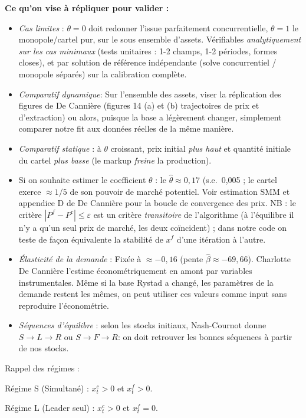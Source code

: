 \documentclass[11pt]{article}
\begin{document}
\textbf{Ce qu'on vise à répliquer pour valider :}
\begin{itemize}\itemsep1pt
\item \emph{Cas limites} : $\theta=0$ doit redonner l'issue parfaitement concurrentielle, $\theta=1$
le monopole/cartel pur, sur le sous ensemble d'assets. Vérifiables \emph{analytiquement sur les cas minimaux} (tests unitaires : 1-2 champs, 1-2 périodes, formes closes), et par solution de référence indépendante (solve concurrentiel / monopole séparés) sur la calibration complète.
\item \emph{Comparatif dynamique}: Sur l'ensemble des assets, viser la réplication des figures de De Cannière (figures 14 (a) et (b) trajectoires de prix et d'extraction) ou alors, puisque la base a légèrement changer, simplement comparer notre fit aux données réelles de la même manière. 
\item \emph{Comparatif statique} : à $\theta$ croissant, prix initial \emph{plus haut} et quantité
initiale du cartel \emph{plus basse} (le markup \emph{freine} la production).
\item Si on souhaite estimer le coefficient $\theta$ : le $\hat\theta\approx 0{,}17$ (s.e.\ 0{,}005 ;  le cartel exerce $\approx 1/5$ de son pouvoir de marché potentiel. Voir estimation SMM et appendice D de De Cannière pour la boucle de convergence des prix. NB : le critère $|P^f-P^c|\le\varepsilon$ est un critère \emph{transitoire} de l'algorithme (à l'équilibre il n'y a qu'un seul prix de marché, les deux co\"incident) ; dans notre code on teste de façon équivalente la stabilité de $x^f$ d'une itération à l'autre.
\item \emph{Élasticité de la demande} : Fixée à $\approx -0{,}16$ (pente $\hat\beta\approx-69{,}66$). Charlotte De Cannière l'estime économétriquement en amont par variables instrumentales. Même si la base Rystad a changé, les paramètres de la demande restent les mêmes, on peut utiliser ces valeurs comme input sans reproduire l'économétrie. 
\item \emph{Séquences d'équilibre} : selon les stocks initiaux, Nash-Cournot donne $S\!\to\!L\!\to\!R$
ou $S\!\to\!F\!\to\!R$: on doit retrouver les bonnes séquences à partir de nos stocks.
\end{itemize}

Rappel des régimes : 

Régime S (Simultané) : $x^c_t > 0$ et $x^f_t > 0$.  

Régime L (Leader seul) : $x^c_t > 0$ et $x^f_t = 0$.  
\end{document}
